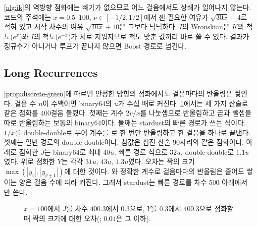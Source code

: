\cref{alg:ik}의 역방향 점화에는 빼기가 없으므로 어느 걸음에서도 상쇄가 일어나지 않는다. 코드의 주석에는 $x=0.5$--$100$, $\nu\in[-1/2,1/2]$에서 잰 필요한 여유가 $\sqrt{30x}+4$로 적혀 있고 시작 차수의 여유 $\sqrt{40x}+10$은 그보다 넉넉하다. $I$의 Wronskian은 $K$의 척도($e^x$)와 $I$의 척도($e^{-x}$)가 서로 지워지므로 척도 맞춘 값끼리 바로 쓸 수 있다. 결과가 정규수가 아니거나 루프가 끝나지 않으면 Boost 경로로 넘긴다.

\subsection{Long Recurrences}

\cref{prop:discrete-green}에 따르면 안정한 방향의 점화에서도 걸음마다의 반올림은 쌓인다. 걸음 수 $n$이 수백이면 binary64의 $u$가 수십 배로 커진다. \cref{fig:threeway}에서는 세 가지 산술로 같은 점화를 400걸음 돌렸다. 첫째는 계수 $2v/x$를 나눗셈으로 반올림하고 곱과 뺄셈을 따로 반올림하는 보통의 binary64이다. 둘째는 stardust의 빠른 경로가 쓰는 식이다. $1/x$를 double-double로 두어 계수를 로 한 번만 반올림하고 한 걸음을  하나로 끝낸다. 셋째는 일반 경로의 double-double이다. 참값은 십진 산술 $90$자리의 같은 점화이다. 아래로 점화한 $J$는 binary64로 최대 $40u$, 빠른 경로 식으로 $32u$, double-double로 $1.1u$였다. 위로 점화한 $Y$는 각각 $31u$, $43u$, $1.3u$였다. 오차는 짝의 크기 $\max(|y_v|,|y_{v\pm1}|)$에 대한 것이다. 와 정확한 계수로 걸음마다의 반올림은 줄어도 쌓이는 양은 걸음 수에 따라 커진다. 그래서 stardust는 빠른 경로를 차수 $500$ 아래에서만 쓴다.

\begin{figure}[htbp]
\centering
{}
\caption{$x=100$에서 $J$를 차수 $400.3$에서 $0.3$으로, $Y$를 $0.3$에서 $400.3$으로 점화할 때 짝의 크기에 대한 오차(; $0.01$은 그 이하).}
\label{fig:threeway}
\end{figure}

